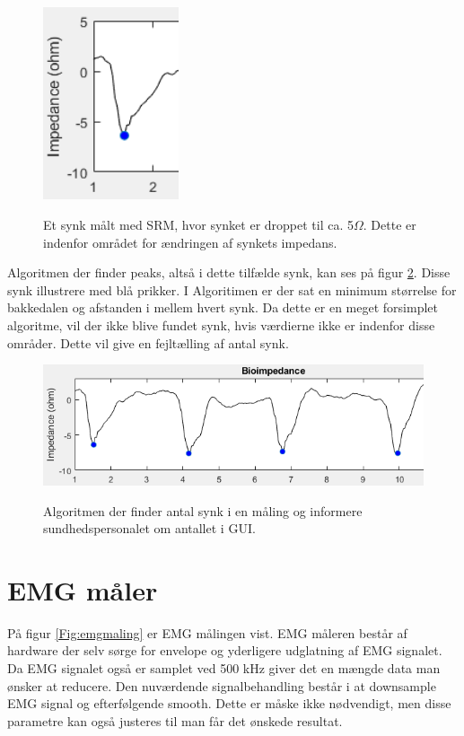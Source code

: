 \begin{figure}[H]
\centering
{\includegraphics[width=4cm]
{Figure/synkfraGUI5ohm}}
\caption{Et synk målt med SRM, hvor synket er droppet til ca. 5$\Omega$. Dette er indenfor området for ændringen af synkets impedans.}
\label{Fig:synkfraGUI5ohm}
\end{figure} 

Algoritmen der finder peaks, altså i dette tilfælde synk, kan ses på figur \ref{Fig:synkfundet}. Disse synk illustrere med blå prikker. I Algoritimen er der sat en minimum størrelse for bakkedalen og afstanden i mellem hvert synk. Da dette er en meget forsimplet algoritme, vil der ikke blive fundet synk, hvis værdierne ikke er indenfor disse områder. Dette vil give en fejltælling af antal synk.

\begin{figure}[H]
\centering
{\includegraphics[width=\linewidth]
{Figure/synkfundet}}
\caption{Algoritmen der finder antal synk i en måling og informere sundhedspersonalet om antallet i GUI.}
\label{Fig:synkfundet}
\end{figure} 



\section{EMG måler}

På figur \ref{Fig:emgmaling} er EMG målingen vist. EMG måleren består af hardware der selv sørge for envelope og yderligere udglatning af EMG signalet. Da EMG signalet også er samplet ved 500 kHz giver det en mængde data man ønsker at reducere. Den nuværdende signalbehandling består i at downsample EMG signal og efterfølgende smooth. Dette er måske ikke nødvendigt, men disse parametre kan også justeres til man får det ønskede resultat. 

